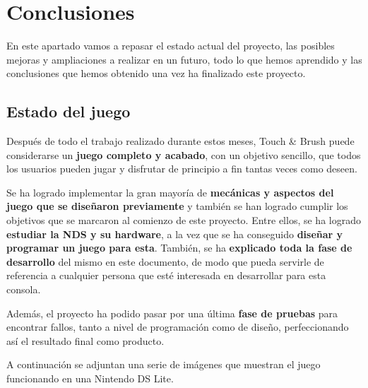 
\chapter{Conclusiones}

En este apartado vamos a repasar el estado actual del proyecto, las posibles mejoras y ampliaciones a realizar en un futuro, todo lo que hemos aprendido y las conclusiones que hemos obtenido una vez ha finalizado este proyecto.

\section{Estado del juego}

Después de todo el trabajo realizado durante estos meses, Touch \& Brush puede considerarse un \textbf{juego completo y acabado}, con un objetivo sencillo, que todos los usuarios pueden jugar y disfrutar de principio a fin tantas veces como deseen.

\vspace{0.5cm}

Se ha logrado implementar la gran mayoría de \textbf{mecánicas y aspectos del juego que se diseñaron previamente} y también se han logrado cumplir los objetivos que se marcaron al comienzo de este proyecto. Entre ellos, se ha logrado \textbf{estudiar la NDS y su hardware}, a la vez que se ha conseguido \textbf{diseñar y programar un juego para esta}. También, se ha \textbf{explicado toda la fase de desarrollo} del mismo en este documento, de modo que pueda servirle de referencia a cualquier persona que esté interesada en desarrollar para esta consola.

\vspace{0.5cm}

Además, el proyecto ha podido pasar por una última \textbf{fase de pruebas} para encontrar fallos, tanto a nivel de programación como de diseño, perfeccionando así el resultado final como producto.

\vspace{0.5cm}

A continuación se adjuntan una serie de imágenes que muestran el juego funcionando en una Nintendo DS Lite.

